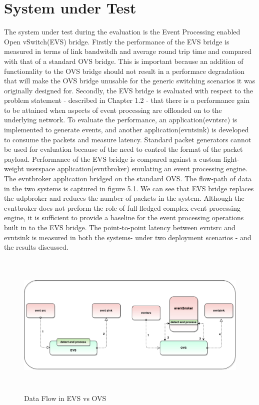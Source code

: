 \section{System under Test}
The system under test during the evaluation is the Event Processing enabled Open vSwitch(EVS) bridge. Firstly the performance of the EVS bridge is measured in terms of link bandwitdh and average round trip time and compared with that of a standard OVS bridge. This is important because an addition of functionality to the OVS bridge should not result in a performace degradation that will make the OVS bridge unusable for the generic switching scenarios it was originally designed for. 
\newline
Secondly, the EVS bridge is evaluated with respect to the problem statement - described in Chapter 1.2 - that there is a performance gain to be attained when aspects of event processing are offloaded on to the underlying network. To evaluate the performance, an  application(evntsrc) is implemented to generate events, and another application(evntsink) is developed to consume the packets and measure latency. Standard packet generators cannot be used for evaluation because of the need to control the format of the packet payload. Performance of the EVS bridge is compared against a custom light-weight userspace application(evntbroker) emulating an event processing engine. The evntbroker application bridged on the standard OVS. The flow-path of data in the two systems is captured in figure 5.1. We can see that EVS bridge replaces the udpbroker and reduces the number of packets in the system. Although the evntbroker does not preform the role of full-fledged complex event processing engine, it is sufficient to provide a baseline for the event processing operations built in to the EVS bridge. The point-to-point latency between evntsrc and evntsink is measured in both the systems- under two deployment scenarios - and the results discussed.

 \begin{figure}[H]    
	\caption{Data Flow in EVS vs OVS}
		\includegraphics[height=7cm]{evsovs.pdf}
\end{figure}



